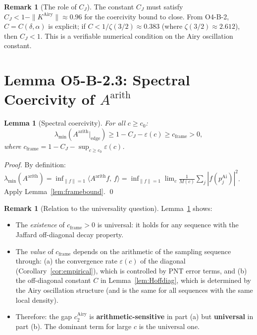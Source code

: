 \documentclass[12pt,a4paper]{amsart}
\newtheorem{lemma}[theorem]{Lemma}
\theoremstyle{definition}
\newtheorem{remark}[theorem]{Remark}
\newcommand{\KAi}{K^{\mathrm{Airy}}}
\newcommand{\Aarith}{A^{\mathrm{arith}}}
\newcommand{\norm}[1]{\|#1\|}
\newcommand{\ip}[2]{\langle #1,\, #2\rangle}
\begin{document}
\begin{remark}[The role of $C_J$]
The constant $C_J$ must satisfy $C_J < 1 - \norm{\KAi} \approx 0.96$
for the coercivity bound to close.
From O4-B-2, $C = C(\delta,\alpha)$ is explicit;
if $C < 1/\zeta(3/2) \approx 0.383$ (where $\zeta(3/2) \approx 2.612$),
then $C_J < 1$.
This is a verifiable numerical condition on the Airy oscillation constant.
\end{remark}

\section{Lemma O5-B-2.3: Spectral Coercivity of $\Aarith$}
\label{sec:coercivity}

\begin{lemma}[Spectral coercivity]\label{lem:coercivity}
For all $c \ge c_0$:
\begin{equation}\label{eq:coercivity}
  \lambda_{\min}(\Aarith|_{\mathrm{edge}})
  \ge 1 - C_J - \varepsilon(c)
  \ge c_{\mathrm{frame}} > 0,
\end{equation}
where $c_{\mathrm{frame}} = 1 - C_J - \sup_{c \ge c_0}\varepsilon(c)$.
\end{lemma}

\begin{proof}
By definition:
$\lambda_{\min}(\Aarith) = \inf_{\norm{f}=1}\ip{\Aarith f}{f}
= \inf_{\norm{f}=1} \lim_{c}\frac{1}{M(c)}\sum_j|f(p_j^{\mathrm{Ai}})|^2$.
Apply Lemma~\ref{lem:framebound}. \qed
\end{proof}

\begin{remark}[Relation to the universality question]
Lemma~\ref{lem:coercivity} shows:
\begin{itemize}
  \item The \emph{existence} of $c_{\mathrm{frame}} > 0$ is universal:
    it holds for any sequence with the Jaffard off-diagonal decay property.
  \item The \emph{value} of $c_{\mathrm{frame}}$ depends on the arithmetic
    of the sampling sequence through:
    (a) the convergence rate $\varepsilon(c)$ of the diagonal (Corollary~\ref{cor:empirical}),
    which is controlled by PNT error terms,
    and (b) the off-diagonal constant $C$ in Lemma~\ref{lem:Hoffdiag},
    which is determined by the Airy oscillation structure
    (and is the same for all sequences with the same local density).
  \item Therefore: the gap $c_2^{\mathrm{Airy}}$ is \textbf{arithmetic-sensitive}
    in part (a) but \textbf{universal} in part (b).
    The dominant term for large $c$ is the universal one.
\end{itemize}
\end{remark}
\end{document}
